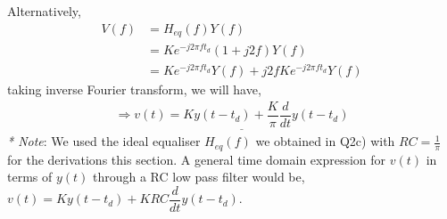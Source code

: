 \documentclass[11pt]{article}
\begin{document}
\begin{enumerate}[label=(\alph*)]
Alternatively,
\begin{align*}
V(f)&=H_{eq}(f)Y(f)\\
&=Ke^{-j2\pi f t_d}(1+j2f)Y(f)\\
&=Ke^{-j2\pi f t_d}Y(f)+j2fKe^{-j2\pi f t_d}Y(f)
\end{align*}
taking inverse Fourier transform, we will have,
\begin{align*}
\Rightarrow \underline{v(t)=Ky(t-t_d)+\dfrac{K}{\pi}\dfrac{d}{dt}y(t-t_d)}
\end{align*}
\textit{* Note}: We used the ideal equaliser $H_{eq}(f)$ we obtained in Q2c) with $RC = \frac{1}{\pi}$ for the derivations this section.
A general time domain expression for $v(t)$ in terms of $y(t)$ through a RC low pass filter would be, $v(t)=Ky(t-t_d)+KRC\dfrac{d}{dt}y(t-t_d)$.\\


\end{enumerate}
\end{document}
